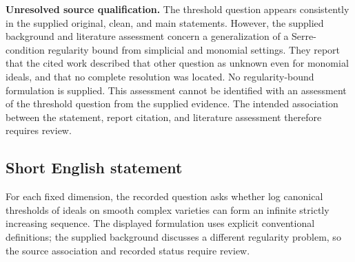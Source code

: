\documentclass[11pt]{article}
\begin{document}
\textbf{Unresolved source qualification.} The threshold question appears consistently in the supplied original, clean, and main statements. However, the supplied background and literature assessment concern a generalization of a Serre-condition regularity bound from simplicial and monomial settings. They report that the cited work described that other question as unknown even for monomial ideals, and that no complete resolution was located. No regularity-bound formulation is supplied. This assessment cannot be identified with an assessment of the threshold question from the supplied evidence. The intended association between the statement, report citation, and literature assessment therefore requires review.
\subsection{Short English statement}
For each fixed dimension, the recorded question asks whether log canonical thresholds of ideals on smooth complex varieties can form an infinite strictly increasing sequence. The displayed formulation uses explicit conventional definitions; the supplied background discusses a different regularity problem, so the source association and recorded status require review.
\end{document}
